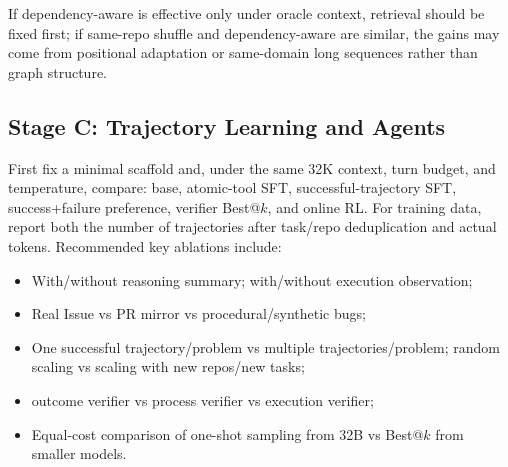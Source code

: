 \documentclass[10pt,a4paper,UTF8,fontset=none]{ctexart}
\begin{document}
If dependency-aware is effective only under oracle context, retrieval should be fixed first; if same-repo shuffle and dependency-aware are similar, the gains may come from positional adaptation or same-domain long sequences rather than graph structure.

\subsection{Stage C: Trajectory Learning and Agents}

First fix a minimal scaffold and, under the same 32K context, turn budget, and temperature, compare: base, atomic-tool SFT, successful-trajectory SFT, success+failure preference, verifier Best@$k$, and online RL. For training data, report both the number of trajectories after task/repo deduplication and actual tokens. Recommended key ablations include:

\begin{itemize}
  \item With/without reasoning summary; with/without execution observation;
  \item Real Issue vs PR mirror vs procedural/synthetic bugs;
  \item One successful trajectory/problem vs multiple trajectories/problem; random scaling vs scaling with new repos/new tasks;
  \item outcome verifier vs process verifier vs execution verifier;
  \item Equal-cost comparison of one-shot sampling from 32B vs Best@$k$ from smaller models.
\end{itemize}
\end{document}
